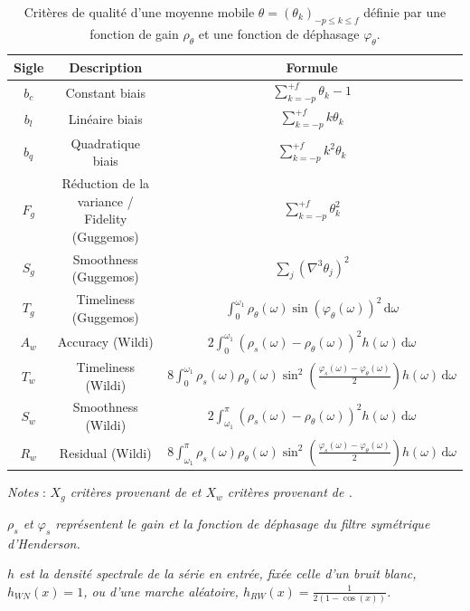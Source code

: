 \documentclass[
  11pt,
  french,
  a4paper]{article}
\newcommand\1{\mathds{1}}
\newcommand\ud{\,\mathrm{d}}
\begin{document}
\begin{table}

\caption{\label{tab:QC}Critères de qualité d'une moyenne mobile $\theta=(\theta_k)_{-p\leq k\leq f}$ définie par une fonction de gain $\rho_{\theta}$ et une fonction de déphasage $\varphi_\theta$.}
{
\centering
\begin{tabular}[t]{ccc}
\toprule
Sigle & Description & Formule\\
\midrule
$b_c$ & Constant biais & $\sum_{k=-p}^{+f}\theta_{k}-1$\\
$b_l$ & Linéaire biais & $\sum_{k=-p}^{+f}k\theta_{k}$\\
$b_q$ & Quadratique biais & $\sum_{k=-p}^{+f}k^{2}\theta_{k}$\\
$F_g$ & Réduction de la variance / Fidelity (Guggemos) & $\sum_{k=-p}^{+f}\theta_{k}^{2}$\\
$S_g$ & Smoothness (Guggemos) & $\sum_{j}(\nabla^{3}\theta_{j})^{2}$\\
\addlinespace
$T_g$ & Timeliness (Guggemos) & $\int_{0}^{\omega_1}\rho_{\theta}(\omega)\sin(\varphi_{\theta}(\omega))^{2}\ud\omega$\\
$A_w$ & Accuracy (Wildi) & $2\int_0^{\omega_1}\left(\rho_{s}(\omega)-\rho_{\theta}(\omega)\right)^{2}h(\omega)\ud\omega$\\
$T_w$ & Timeliness (Wildi) & $8\int_0^{\omega_1} \rho_{s}(\omega)\rho_{\theta}(\omega)\sin^{2}\left(\frac{\varphi_s(\omega)-\varphi_\theta(\omega)}{2}\right)h(\omega)\ud\omega$\\
$S_w$ & Smoothness (Wildi) & $2\int_{\omega_1}^{\pi}\left(\rho_{s}(\omega)-\rho_{\theta}(\omega)\right)^{2}h(\omega)\ud\omega$\\
$R_w$ & Residual (Wildi) & $8\int_{\omega_1}^{\pi} \rho_{s}(\omega)\rho_{\theta}(\omega)\sin^{2}\left(\frac{\varphi_s(\omega)-\varphi_\theta(\omega)}{2}\right)h(\omega)\ud\omega$\\
\bottomrule
\end{tabular}
}
\footnotesize


\emph{Notes} : \emph{\(X_g\) critères provenant de \textcite{ch15HBSA} et \(X_w\) critères provenant de \textcite{trilemmaWMR2019}.}

\emph{\(\rho_s\) et \(\varphi_s\) représentent le gain et la fonction de déphasage du filtre symétrique d'Henderson.}

\emph{\(h\) est la densité spectrale de la série en entrée, fixée celle d'un bruit blanc, \(h_{WN}(x)=1\), ou d'une marche aléatoire, \(h_{RW}(x)=\frac{1}{2(1-\cos(x))}\).}
\normalsize\end{table}
\end{document}
